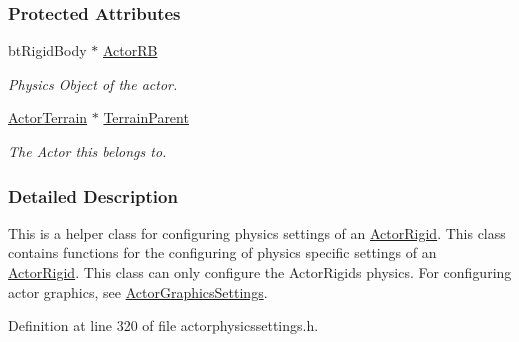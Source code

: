 \subsubsection*{Protected Attributes}
\begin{DoxyCompactItemize}
\item 
\hypertarget{classphys_1_1ActorTerrainPhysicsSettings_a5b6aa0ee76eb72faeb4cb08102e225b8}{
btRigidBody $\ast$ \hyperlink{classphys_1_1ActorTerrainPhysicsSettings_a5b6aa0ee76eb72faeb4cb08102e225b8}{ActorRB}}
\label{classphys_1_1ActorTerrainPhysicsSettings_a5b6aa0ee76eb72faeb4cb08102e225b8}

\begin{DoxyCompactList}\small\item\em Physics Object of the actor. \item\end{DoxyCompactList}\item 
\hypertarget{classphys_1_1ActorTerrainPhysicsSettings_a213df216c2804c25a9a2e7f10e8c58ed}{
\hyperlink{classphys_1_1ActorTerrain}{ActorTerrain} $\ast$ \hyperlink{classphys_1_1ActorTerrainPhysicsSettings_a213df216c2804c25a9a2e7f10e8c58ed}{TerrainParent}}
\label{classphys_1_1ActorTerrainPhysicsSettings_a213df216c2804c25a9a2e7f10e8c58ed}

\begin{DoxyCompactList}\small\item\em The Actor this belongs to. \item\end{DoxyCompactList}\end{DoxyCompactItemize}


\subsubsection{Detailed Description}
This is a helper class for configuring physics settings of an \hyperlink{classphys_1_1ActorRigid}{ActorRigid}. This class contains functions for the configuring of physics specific settings of an \hyperlink{classphys_1_1ActorRigid}{ActorRigid}. This class can only configure the ActorRigids physics. For configuring actor graphics, see \hyperlink{classphys_1_1ActorGraphicsSettings}{ActorGraphicsSettings}. 

Definition at line 320 of file actorphysicssettings.h.



